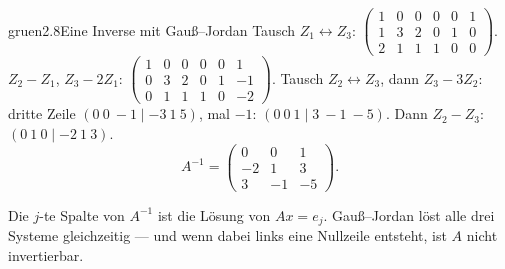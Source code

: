 \begin{loesungkarte}{gruen}{2.8}{Eine Inverse mit Gauß--Jordan}
Tausch $Z_1\leftrightarrow Z_3$:
$\left(\begin{array}{ccc|ccc}1 & 0 & 0 & 0 & 0 & 1\\ 1 & 3 & 2 & 0 & 1 & 0\\ 2 & 1 & 1 & 1 & 0 & 0\end{array}\right)$.
$Z_2 - Z_1$, $Z_3 - 2Z_1$:
$\left(\begin{array}{ccc|ccc}1 & 0 & 0 & 0 & 0 & 1\\ 0 & 3 & 2 & 0 & 1 & -1\\ 0 & 1 & 1 & 1 & 0 & -2\end{array}\right)$.
Tausch $Z_2\leftrightarrow Z_3$, dann $Z_3 - 3Z_2$: dritte Zeile $(0\ 0\ -1\mid -3\ 1\ 5)$, mal $-1$: $(0\ 0\ 1\mid 3\ -1\ -5)$. Dann $Z_2 - Z_3$: $(0\ 1\ 0\mid -2\ 1\ 3)$.
\[ A^{-1} = \begin{pmatrix}0 & 0 & 1\\ -2 & 1 & 3\\ 3 & -1 & -5\end{pmatrix}. \]
\begin{mitnehmen}\kastentext
Die $j$-te Spalte von $A^{-1}$ ist die Lösung von $Ax = e_j$. Gauß--Jordan löst alle drei Systeme gleichzeitig --- und wenn dabei links eine Nullzeile entsteht, ist $A$ nicht invertierbar.
\end{mitnehmen}
\end{loesungkarte}

